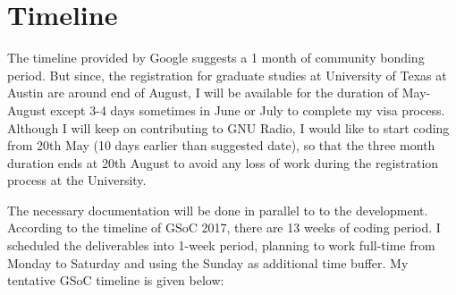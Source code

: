 \documentclass[a4paper, 11pt]{article}
\begin{document}
\section{Timeline}
The timeline provided by Google suggests a 1 month of community bonding period. But since, the registration for graduate studies at University of Texas at Austin are around end of August, I will be available for the duration of May-August except 3-4 days sometimes in June or July to complete my visa process. Although I will keep on contributing to GNU Radio, I would like to start coding from 20th May (10 days earlier than suggested date), so that the three month duration ends at 20th August to avoid any loss of work during the registration process at the University.

The necessary documentation will be done in parallel to to the development. According to the timeline of GSoC 2017, there are 13 weeks of coding period. I scheduled the deliverables into 1-week period, planning to work full-time from Monday to Saturday and using the Sunday as additional time buffer. My tentative GSoC timeline is given below:
\end{document}
